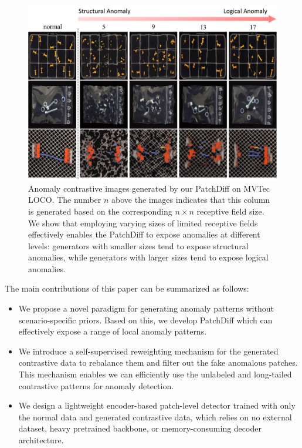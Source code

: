 \documentclass[letterpaper]{article} %
\begin{document}
\begin{figure}[!t]
    \centering
    \includegraphics[width=\linewidth]{images/loco_generation_results.pdf}
    \caption{Anomaly contrastive images generated by our PatchDiff on MVTec LOCO. The number $n$ above the images indicates that this column is generated based on the corresponding $n \times n$ receptive field size. We show that employing varying sizes of limited receptive fields effectively enables the PatchDiff to expose anomalies at different levels: generators with smaller sizes tend to expose structural anomalies, while generators with larger sizes tend to expose logical anomalies.}%
    \label{fig: loco_generation_results}
\end{figure}

The main contributions of this paper can be summarized as follows:
\begin{itemize}
    \item We propose a novel paradigm for generating anomaly patterns without scenario-specific priors. Based on this, we develop PatchDiff which can effectively expose a range of local anomaly patterns.
    \item We introduce a self-supervised reweighting mechanism for the generated contrastive data to rebalance them and filter out the fake anomalous patches. This mechanism enables we can efficiently use the unlabeled and long-tailed contrastive patterns for anomaly detection.
    \item We design a lightweight encoder-based patch-level detector trained with only the normal data and generated contrastive data, which relies on no external dataset, heavy pretrained backbone, or memory-consuming decoder architecture.
\end{itemize}
\end{document}
